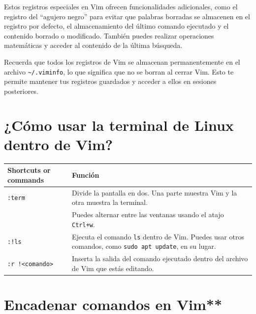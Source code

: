 \documentclass[
  doc,
  floatsintext,
  longtable,
  a4paper,
  nolmodern,
  notxfonts,
  notimes,
  12pt,
  colorlinks=true,linkcolor=blue,citecolor=blue,urlcolor=blue]{apa7}
\newcounter{none} %
\begin{document}
Estos registros especiales en Vim ofrecen funcionalidades adicionales,
como el registro del ``agujero negro'' para evitar que palabras borradas
se almacenen en el registro por defecto, el almacenamiento del último
comando ejecutado y el contenido borrado o modificado. También puedes
realizar operaciones matemáticas y acceder al contenido de la última
búsqueda.

Recuerda que todos los registros de Vim se almacenan permanentemente en
el archivo \texttt{\textasciitilde{}/.viminfo}, lo que significa que no
se borran al cerrar Vim. Esto te permite mantener tus registros
guardados y acceder a ellos en sesiones posteriores.

\section{¿Cómo usar la terminal de Linux dentro de
Vim?}\label{cuxf3mo-usar-la-terminal-de-linux-dentro-de-vim}

{\def\LTcaptype{none} %
\begin{longtable}[]{@{}
  >{\raggedright\arraybackslash}p{}
  >{\raggedright\arraybackslash}p{}@{}}
\toprule\noalign{}
\begin{minipage}[b]{\linewidth}\raggedright
Shortcuts or commands
\end{minipage} & \begin{minipage}[b]{\linewidth}\raggedright
Función
\end{minipage} \\
\midrule\noalign{}
\endhead
\bottomrule\noalign{}
\endlastfoot
\texttt{:term} & Divide la pantalla en dos. Una parte muestra Vim y la
otra muestra la terminal. \\
& Puedes alternar entre las ventanas usando el atajo \texttt{Ctrl+w}. \\
\texttt{:!ls} & Ejecuta el comando \texttt{ls} dentro de Vim. Puedes
usar otros comandos, como \texttt{sudo\ apt\ update}, en su lugar. \\
\texttt{:r\ !\textless{}comando\textgreater{}} & Inserta la salida del
comando ejecutado dentro del archivo de Vim que estás editando. \\
\end{longtable}
}

\section{Encadenar comandos en Vim**}\label{encadenar-comandos-en-vim}
\end{document}
